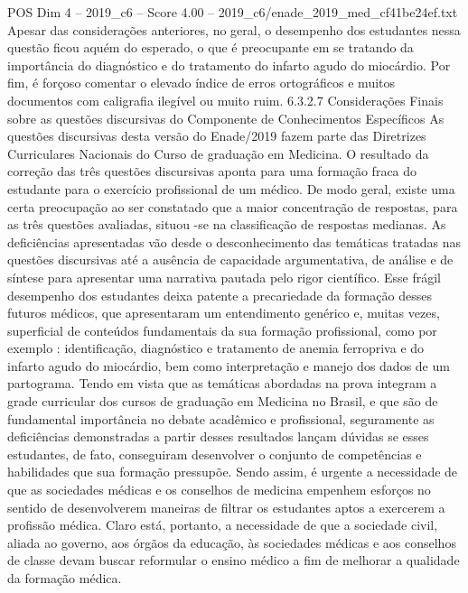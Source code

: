 \begin{textsample}{POS Dim 4 – 2019\_c6 – Score 4.00 – 2019\_c6/enade\_2019\_med\_cf41be24ef.txt}
Apesar das considerações anteriores, no geral, o desempenho dos estudantes nessa questão ficou aquém do esperado, o que é preocupante em se tratando da importância do diagnóstico e do tratamento do infarto agudo do miocárdio.
Por fim, é forçoso comentar o elevado índice de erros ortográficos e muitos documentos com caligrafia ilegível ou muito ruim. 6.3.2.7 Considerações Finais sobre as questões discursivas do Componente de Conhecimentos Específicos As questões discursivas desta versão do Enade/2019 fazem parte das Diretrizes Curriculares Nacionais do Curso de graduação em Medicina.
O resultado da correção das três questões discursivas aponta para uma formação fraca do estudante para o exercício profissional de um médico.
De modo geral, existe uma certa preocupação ao ser constatado que a maior concentração de respostas, para as três questões avaliadas, situou -se na classificação de respostas medianas.
As deficiências apresentadas vão desde o desconhecimento das temáticas tratadas nas questões discursivas até a ausência de capacidade argumentativa, de análise e de síntese para apresentar uma narrativa pautada pelo rigor científico.
Esse frágil desempenho dos estudantes deixa patente a precariedade da formação desses futuros médicos, que apresentaram um entendimento genérico e, muitas vezes, superficial de conteúdos fundamentais da sua formação profissional, como por exemplo : identificação, diagnóstico e tratamento de anemia ferropriva e do infarto agudo do miocárdio, bem como interpretação e manejo dos dados de um partograma.
Tendo em vista que as temáticas abordadas na prova integram a grade curricular dos cursos de graduação em Medicina no Brasil, e que são de fundamental importância no debate acadêmico e profissional, seguramente as deficiências demonstradas a partir desses resultados lançam dúvidas se esses estudantes, de fato, conseguiram desenvolver o conjunto de competências e habilidades que sua formação pressupõe.
Sendo assim, é urgente a necessidade de que as sociedades médicas e os conselhos de medicina empenhem esforços no sentido de desenvolverem maneiras de filtrar os estudantes aptos a exercerem a profissão médica.
Claro está, portanto, a necessidade de que a sociedade civil, aliada ao governo, aos órgãos da educação, às sociedades médicas e aos conselhos de classe devam buscar reformular o ensino médico a fim de melhorar a qualidade da formação médica.

\end{textsample}
